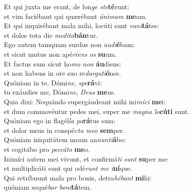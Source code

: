 \evenverse Et qui juxta me erant, de lon\textit{ge} \textit{ste}\textbf{té}runt:~\*\\
\evenverse et vim faciébant qui quærébant \textit{á}\textit{ni}\textit{mam} \textbf{me}am.\\
\oddverse Et qui inquirébant mala mihi, locúti sunt \textit{va}\textit{ni}\textbf{tá}tes:~\*\\
\oddverse et dolos tota die \textit{me}\textit{di}\textit{ta}\textbf{bán}tur.\\
\evenverse Ego autem tamquam surdus non \textit{au}\textit{di}\textbf{é}bam:~\*\\
\evenverse et sicut mutus non apé\textit{ri}\textit{ens} \textit{os} \textbf{su}um.\\
\oddverse Et factus sum sicut ho\textit{mo} \textit{non} \textbf{áu}diens:~\*\\
\oddverse et non habens in ore suo re\textit{dar}\textit{gu}\textit{ti}\textbf{ó}nes.\\
\evenverse Quóniam in te, Dómi\textit{ne}, \textit{spe}\textbf{rá}vi:~\*\\
\evenverse tu exáudies me, Dómi\textit{ne}, \textit{De}\textit{us} \textbf{me}us.\\
\oddverse Quia dixi: Nequándo supergáudeant mihi ini\textit{mí}\textit{ci} \textbf{me}i:~\*\\
\oddverse et dum commovéntur pedes mei, super me \textit{ma}\textit{gna} \textit{lo}\textbf{cú}\textbf{ti} sunt.\\
\evenverse Quóniam ego in flagél\textit{la} \textit{pa}\textbf{rá}tus sum:~\*\\
\evenverse et dolor meus in conspé\textit{ctu} \textit{me}\textit{o} \textbf{sem}per.\\
\oddverse Quóniam iniquitátem meam an\textit{nun}\textit{ti}\textbf{á}bo:~\*\\
\oddverse et cogitábo pro \textit{pec}\textit{cá}\textit{to} \textbf{me}o.\\
\evenverse Inimíci autem mei vivunt, et confirmá\textit{ti} \textit{sunt} \textbf{su}per me:~\*\\
\evenverse et multiplicáti sunt qui odé\textit{runt} \textit{me} \textit{i}\textbf{ní}que.\\
\oddverse Qui retríbuunt mala pro bonis, detra\textit{hé}\textit{bant} \textbf{mi}hi:~\*\\
\oddverse quóniam sequé\textit{bar} \textit{bo}\textit{ni}\textbf{tá}tem.\\

